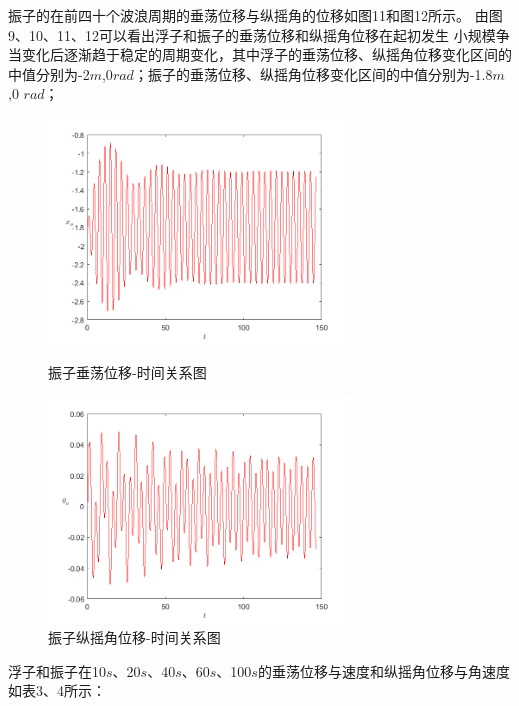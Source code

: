 \documentclass{my_paper}
\begin{document}
振子的在前四十个波浪周期的垂荡位移与纵摇角的位移如图11和图12所示。
由图9、10、11、12可以看出浮子和振子的垂荡位移和纵摇角位移在起初发生
小规模争当变化后逐渐趋于稳定的周期变化，其中浮子的垂荡位移、纵摇角位移变化区间的中值分别为-2$m$,0$rad$；振子的垂荡位移、纵摇角位移变化区间的中值分别为-1.8$m$,0 $rad$；
\begin{figure}[!htbp]
    \centering
    \begin{minipage}[t]{0.48\textwidth}
    \centering
    \includegraphics[width=8cm]{3_xo.png}
    \caption{振子垂荡位移-时间关系图}
  \label{zhengzi chui}
    \end{minipage}
    \begin{minipage}[t]{0.48\textwidth}
    \centering
    \includegraphics[width=8cm]{3_thetao.png}
    \caption{振子纵摇角位移-时间关系图}
    \label{zhengzi jiao}
    \end{minipage}
    \end{figure}

\newpage


浮子和振子在10$s$、20$s$、40$s$、60$s$、100$s$的垂荡位移与速度和纵摇角位移与角速度如表3、4所示：
\end{document}
